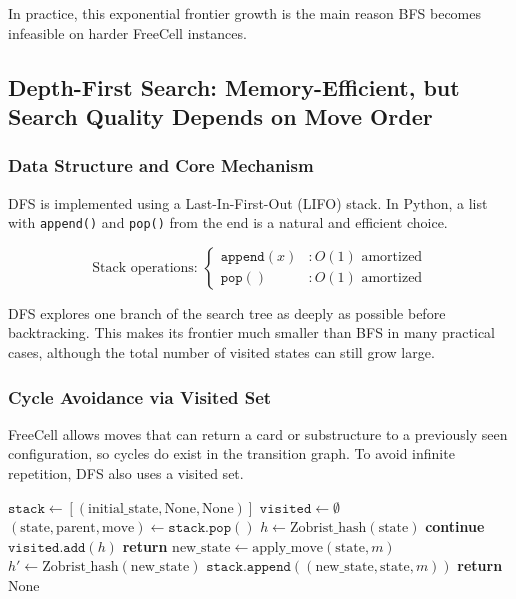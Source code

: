 \documentclass{article}
\begin{document}
In practice, this exponential frontier growth is the main reason BFS becomes infeasible on harder FreeCell instances.

\subsection{Depth-First Search: Memory-Efficient, but Search Quality Depends on Move Order}

\subsubsection{Data Structure and Core Mechanism}

DFS is implemented using a Last-In-First-Out (LIFO) stack. In Python, a list with \texttt{append()} and \texttt{pop()} from the end is a natural and efficient choice.

\begin{equation}
\text{Stack operations: } \begin{cases}
\texttt{append}(x) & : O(1) \text{ amortized} \\
\texttt{pop}() & : O(1) \text{ amortized}
\end{cases}
\end{equation}

DFS explores one branch of the search tree as deeply as possible before backtracking. This makes its frontier much smaller than BFS in many practical cases, although the total number of visited states can still grow large.

\subsubsection{Cycle Avoidance via Visited Set}

FreeCell allows moves that can return a card or substructure to a previously seen configuration, so cycles do exist in the transition graph. To avoid infinite repetition, DFS also uses a visited set.

\begin{algorithm}
\caption{DFS with Cycle Detection}
\begin{algorithmic}[1]
\State $\texttt{stack} \leftarrow [(\text{initial_state}, \text{None}, \text{None})]$
\State $\texttt{visited} \leftarrow \emptyset$
\State $(\text{state}, \text{parent}, \text{move}) \leftarrow \texttt{stack.pop}()$
\State $h \leftarrow \text{Zobrist\_hash}(\text{state})$
\State \textbf{continue}
\EndIf
\State $\texttt{visited.add}(h)$
\State \textbf{return} 
\EndIf
{}
\State $\text{new\_state} \leftarrow \text{apply\_move}(\text{state}, m)$
\State $h' \leftarrow \text{Zobrist\_hash}(\text{new\_state})$
\State $\texttt{stack.append}((\text{new\_state}, \text{state}, m))$
\EndIf
\EndFor
\EndWhile
\State \textbf{return} $\text{None}$
\EndFunction
\end{algorithmic}
\end{algorithm}
\end{document}
